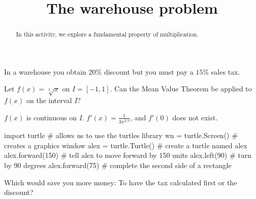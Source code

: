 \documentclass[handout]{ximera}
\title{The warehouse problem}
\begin{document}
\begin{abstract}
In this activity, we explore a fundamental property of multiplication. 
\end{abstract}
\maketitle

In a warehouse you obtain $20\%$ discount but you must pay a $15\%$
sales tax.

\begin{example}
Let $f(x)=\sqrt[3]{x}$ on $I=[-1,1]$. Can the Mean Value Theorem be applied to $f(x)$ on the interval $I$?

\begin{multipleChoice}
\end{multipleChoice}

\begin{explanation}
  \begin{expandable}
    $f(x)$ is continuous on $I$. $f'(x)=\frac{1}{3x^{2/3}}$, and $f'(0)$ does not exist.
  \end{expandable}
\end{explanation}
\end{example}


\begin{python}
  import turtle               # allows us to use the turtles library
  wn = turtle.Screen()        # creates a graphics window
  alex = turtle.Turtle()      # create a turtle named alex
  alex.forward(150)           # tell alex to move forward by 150 units
  alex.left(90)               # turn by 90 degrees
  alex.forward(75)            # complete the second side of a rectangle
\end{python}



\begin{question}
Which would save you more money: To have the tax calculated first or
the discount?
\begin{explanation}
\begin{multipleChoice}
\end{multipleChoice}
\end{explanation}
\end{question}
\end{document}
